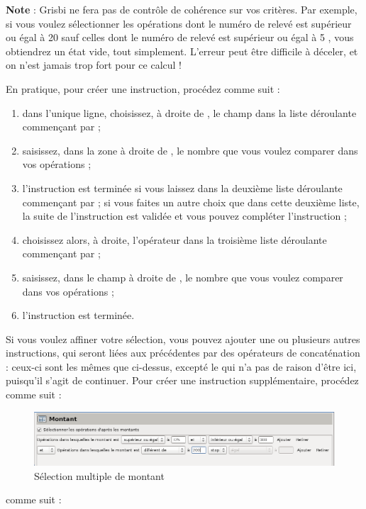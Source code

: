 \textbf{Note} : Grisbi ne fera pas de contrôle de cohérence sur vos critères. Par exemple, si vous voulez sélectionner les opérations \og dont le numéro de relevé est supérieur ou égal à 20 sauf celles dont le numéro de relevé est supérieur ou égal à 5 \fg{}, vous obtiendrez un état vide, tout simplement. L'erreur peut être difficile à déceler, et on n'est jamais trop fort pour ce calcul !

En pratique, pour créer une instruction, procédez comme suit :

\begin{enumerate}
	\item dans l'unique ligne, choisissez, à droite de , le champ dans la liste déroulante commençant par  ; 
	\item saisissez, dans la zone à droite de , le nombre que vous voulez comparer dans vos opérations ;
	\item  l'instruction est terminée si vous laissez  dans la deuxième liste déroulante commençant par  ; si vous faites un autre choix que  dans cette deuxième liste, la suite de l'instruction est validée et vous pouvez compléter l'instruction ;
	 \item choisissez alors, à droite, l'opérateur dans la troisième liste déroulante commençant par  ;
	\item saisissez, dans le champ à droite de , le nombre que vous voulez comparer dans vos opérations ;
	\item l'instruction est terminée.
\end{enumerate}

Si vous voulez affiner votre sélection, vous pouvez ajouter une ou
plusieurs autres instructions, qui seront liées aux précédentes par des opérateurs de concaténation : ceux-ci sont les mêmes que ci-dessus, excepté le  qui n'a pas de raison d'être ici, puisqu'il s'agit de continuer. Pour créer une instruction supplémentaire, procédez \ifIllustration comme suit :

\begin{figure}[ht]
\begin{center}
\includegraphics[scale=0.5]{image/screenshot/reportcreation_datas_multiplesAmounts}
\end{center}
\caption{Sélection multiple de montant}
\label{reportcreation-datas-multiplesAmounts-img}
\end{figure}
\else comme suit :
\fi

